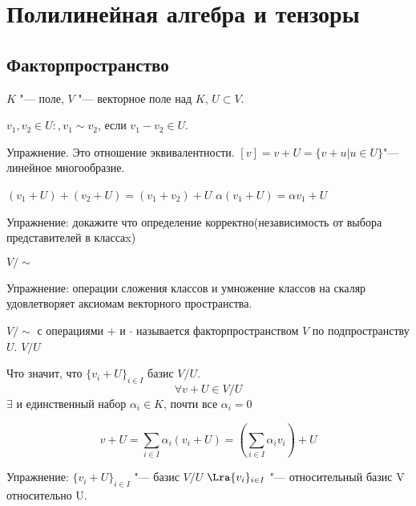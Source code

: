 ﻿\chapter{Полилинейная алгебра и тензоры}
\section{Факторпространство}
$K$ "--- поле, $V$ "--- векторное поле над $K$, $U \subset V$.

$v_1, v_2 \in U \colon ,v_1 \sim v_2$, если $v_1 - v_2 \in U$. 

Упражнение. Это отношение эквивалентности. 
$[v] = v + U = \{v + u| u \in U\}$"--- линейное многообразие. 

$(v_1 + U) + (v_2 + U) = (v_1 + v_2) + U$
$\alpha(v_1 + U) = \alpha v_1 + U$

Упражнение: докажите что определение корректно(независимость от выбора представителей в классаx)

$V/\sim$

Упражнение: операции сложения классов и умножение классов на скаляр удовлетворяет аксиомам векторного пространства.

$V/\sim$ с операциями + и $\cdot$ называется факторпространством $V$ по подпространству $U$. $V/U$ 

Что значит, что $\{v_i + U\}_{i \in I}$ базис $V/U$.
$$\forall v + U \in V/U$$
$\exists$ и единственный набор $\alpha_i \in K$, почти все $\alpha_i = 0$

$$v + U = \sum_{i \in I}\alpha_i(v_i + U) = (\sum_{i \in I}\alpha_i v_i) + U $$


Упражнение:
$\{v_i + U\}_{i \in I}$  "--- базис $V/U$
$\Lra \{v_i\}_{i \in I}$ "--- относительный базис V относительно U.